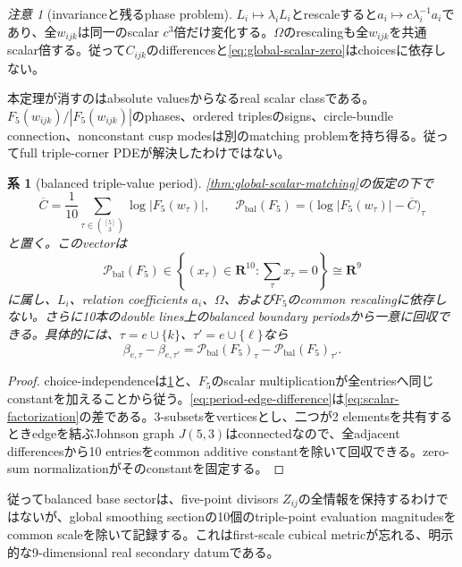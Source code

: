 \documentclass[11pt,a4paper]{ltjsarticle}
\newtheorem{corollary}[theorem]{系}
\theoremstyle{definition}
\theoremstyle{remark}
\newtheorem{remark}[theorem]{注意}
\newcommand{\RR}{\mathbf R}
\begin{document}
\begin{remark}[invarianceと残るphase problem]\label{rem:scalar-invariance}
$L_i\mapsto\lambda_iL_i$とrescaleすると$a_i\mapsto c\lambda_i^{-1}a_i$であり、全$w_{ijk}$は同一のscalar $c^3$倍だけ変化する。$\Omega$のrescalingも全$w_{ijk}$を共通scalar倍する。従って$C_{ijk}$のdifferencesと\eqref{eq:global-scalar-zero}はchoicesに依存しない。

本定理が消すのはabsolute valuesからなるreal scalar classである。$F_5(w_{ijk})/|F_5(w_{ijk})|$のphases、ordered triplesのsigns、circle-bundle connection、nonconstant cusp modesは別のmatching problemを持ち得る。従ってfull triple-corner PDEが解決したわけではない。
\end{remark}

\begin{corollary}[balanced triple-value period]\label{cor:balanced-triple-period}
\cref{thm:global-scalar-matching}の仮定の下で
\begin{equation}\label{eq:balanced-triple-period}
 \overline C=\frac1{10}\sum_{\tau\in\binom{[5]}3}\log|F_5(w_\tau)|,
 \qquad
 \mathcal P_{\mathrm{bal}}(F_5)
 =\bigl(\log|F_5(w_\tau)|-\overline C\bigr)_\tau
\end{equation}
と置く。このvectorは
\[
 \mathcal P_{\mathrm{bal}}(F_5)
 \in
 \left\{(x_\tau)\in\RR^{10}:\sum_\tau x_\tau=0\right\}
 \cong\RR^9
\]
に属し、$L_i$、relation coefficients $a_i$、$\Omega$、および$F_5$のcommon rescalingに依存しない。さらに10本のdouble lines上のbalanced boundary periodsから一意に回収できる。具体的には、$\tau=e\cup\{k\}$、$\tau'=e\cup\{\ell\}$なら
\begin{equation}\label{eq:period-edge-difference}
 \beta_{e,\tau}-\beta_{e,\tau'}
 =\mathcal P_{\mathrm{bal}}(F_5)_\tau
  -\mathcal P_{\mathrm{bal}}(F_5)_{\tau'}.
\end{equation}
\end{corollary}

\begin{proof}
choice-independenceは\cref{rem:scalar-invariance}と、$F_5$のscalar multiplicationが全entriesへ同じconstantを加えることから従う。\eqref{eq:period-edge-difference}は\eqref{eq:scalar-factorization}の差である。3-subsetsをverticesとし、二つが2 elementsを共有するときedgeを結ぶJohnson graph $J(5,3)$はconnectedなので、全adjacent differencesから10 entriesをcommon additive constantを除いて回収できる。zero-sum normalizationがそのconstantを固定する。
\end{proof}

従ってbalanced base sectorは、five-point divisors $Z_{ij}$の全情報を保持するわけではないが、global smoothing sectionの10個のtriple-point evaluation magnitudesをcommon scaleを除いて記録する。これはfirst-scale cubical metricが忘れる、明示的な9-dimensional real secondary datumである。
\end{document}
